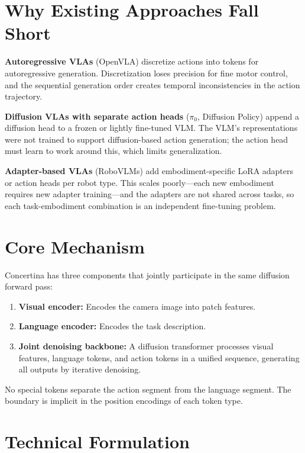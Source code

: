 \documentclass[10pt,twocolumn]{article}
\begin{document}
\section{Why Existing Approaches Fall Short}

\textbf{Autoregressive VLAs} (OpenVLA) discretize actions into tokens for autoregressive generation.
Discretization loses precision for fine motor control, and the sequential generation order creates temporal inconsistencies in the action trajectory.

\textbf{Diffusion VLAs with separate action heads} ($\pi_0$, Diffusion Policy) append a diffusion head to a frozen or lightly fine-tuned VLM.
The VLM's representations were not trained to support diffusion-based action generation; the action head must learn to work around this, which limits generalization.

\textbf{Adapter-based VLAs} (RoboVLMs) add embodiment-specific LoRA adapters or action heads per robot type.
This scales poorly---each new embodiment requires new adapter training---and the adapters are not shared across tasks, so each task-embodiment combination is an independent fine-tuning problem.

\section{Core Mechanism}

Concertina has three components that jointly participate in the same diffusion forward pass:
\begin{enumerate}[leftmargin=1.5em,itemsep=2pt]
  \item \textbf{Visual encoder:} Encodes the camera image into patch features.
  \item \textbf{Language encoder:} Encodes the task description.
  \item \textbf{Joint denoising backbone:} A diffusion transformer processes visual features, language tokens, and action tokens in a unified sequence, generating all outputs by iterative denoising.
\end{enumerate}

No special tokens separate the action segment from the language segment.
The boundary is implicit in the position encodings of each token type.

\section{Technical Formulation}
\end{document}
